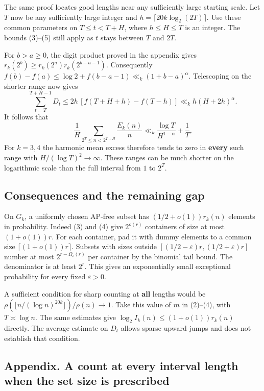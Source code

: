 \documentclass[10pt]{article}
\begin{document}
The same proof locates good lengths near any sufficiently large starting scale. Let \(T\) now be any sufficiently large integer and \(h=\lceil20k\log_2(2T)\rceil\). Use these common parameters on \(T\le t<T+H\), where \(h\le H\le T\) is an integer. The bounds (3)--(5) still apply as \(t\) stays between \(T\) and \(2T\).

For \(b>a\ge0\), the digit product proved in the appendix gives \(r_k(2^b)\ge r_k(2^a)r_k(2^{b-a-1})\). Consequently \(f(b)-f(a)\le \log 2+f(b-a-1)\ll_k (1+b-a)^\alpha\). Telescoping on the shorter range now gives \[
\sum_{t=T}^{T+H-1} D_t
\le 2h\,[f(T+H+h)-f(T-h)]
\ll_k h(H+2h)^\alpha .
\] It follows that \[
\frac1H\sum_{2^T\le n<2^{T+H}}\frac{E_k(n)}{n}
\ll_k \frac{\log T}{H^{1-\alpha}}+\frac1T.
\] For \(k=3,4\) the harmonic mean excess therefore tends to zero in \textbf{every} such range with \(H/(\log T)^2\to\infty\). These ranges can be much shorter on the logarithmic scale than the full interval from \(1\) to \(2^T\).

\subsection{Consequences and the remaining gap}\label{consequences-and-the-remaining-gap}

On \(G_k\), a uniformly chosen AP-free subset has \((1/2+o(1))r_k(n)\) elements in probability. Indeed (3) and (4) give \(2^{o(r)}\) containers of size at most \((1+o(1))r\). For each container, pad it with dummy elements to a common size \(\lceil(1+o(1))r\rceil\). Subsets with sizes outside \([(1/2-\varepsilon)r,(1/2+\varepsilon)r]\) number at most \(2^{r-\Omega_\varepsilon(r)}\) per container by the binomial tail bound. The denominator is at least \(2^r\). This gives an exponentially small exceptional probability for every fixed \(\varepsilon>0\).

A sufficient condition for sharp counting at \textbf{all} lengths would be \(\rho(\lfloor n/(\log n)^{20k}\rfloor)/\rho(n)\to1\). Take this value of \(m\) in (2)--(4), with \(T\asymp\log n\). The same estimates give \(\log_2 I_k(n)\le(1+o(1))r_k(n)\) directly. The average estimate on \(D_t\) allows sparse upward jumps and does not establish that condition.

\subsection{Appendix. A count at every interval length when the set size is prescribed}\label{appendix.-a-count-at-every-interval-length-when-the-set-size-is-prescribed}
\end{document}
